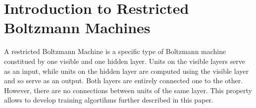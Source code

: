 \documentclass{report}
\begin{document}
	
	
	
	
	
	\section{Introduction to Restricted Boltzmann Machines}
	
	A restricted Boltzmann Machine is a specific type of Boltzmann machine 
	constitued by one visible and one hidden layer. Units on the visible layers serve as 
	an input, while units on the hidden layer are computed using the visible layer and so serve as an output. 
	Both layers are entirely connected one to the other. However, there are no 
	connections between units of the same layer. This property allows to 
	develop training algortihms further described in this paper.
	
\end{document}
